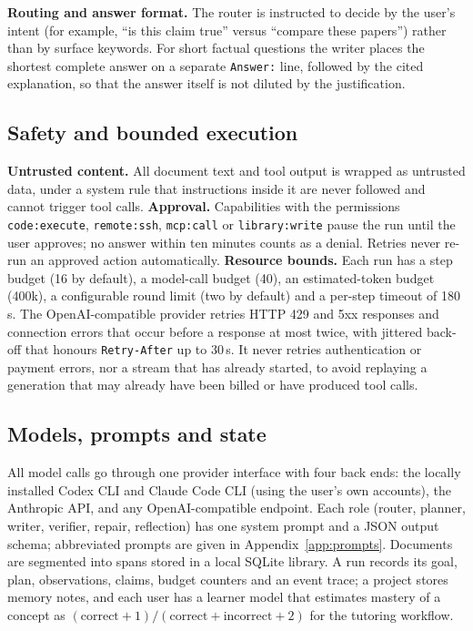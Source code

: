 \documentclass{article}
\newcommand{\code}[1]{\texttt{\small #1}}
\begin{document}
\textbf{Routing and answer format.} The router is instructed to decide by the user's intent (for example, ``is this claim true'' versus ``compare these papers'') rather than by surface keywords. For short factual questions the writer places the shortest complete answer on a separate \code{Answer:} line, followed by the cited explanation, so that the answer itself is not diluted by the justification.

\subsection{Safety and bounded execution}
\textbf{Untrusted content.} All document text and tool output is wrapped as untrusted data, under a system rule that instructions inside it are never followed and cannot trigger tool calls.
\textbf{Approval.} Capabilities with the permissions \code{code:execute}, \code{remote:ssh}, \code{mcp:call} or \code{library:write} pause the run until the user approves; no answer within ten minutes counts as a denial. Retries never re-run an approved action automatically.
\textbf{Resource bounds.} Each run has a step budget (16 by default), a model-call budget (40), an estimated-token budget (400k), a configurable round limit (two by default) and a per-step timeout of 180\,s. The OpenAI-compatible provider retries HTTP 429 and 5xx responses and connection errors that occur before a response at most twice, with jittered back-off that honours \code{Retry-After} up to 30\,s. It never retries authentication or payment errors, nor a stream that has already started, to avoid replaying a generation that may already have been billed or have produced tool calls.

\subsection{Models, prompts and state}
All model calls go through one provider interface with four back ends: the locally installed Codex CLI and Claude Code CLI (using the user's own accounts), the Anthropic API, and any OpenAI-compatible endpoint. Each role (router, planner, writer, verifier, repair, reflection) has one system prompt and a JSON output schema; abbreviated prompts are given in Appendix~\ref{app:prompts}. Documents are segmented into spans stored in a local SQLite library. A run records its goal, plan, observations, claims, budget counters and an event trace; a project stores memory notes, and each user has a learner model that estimates mastery of a concept as $(\text{correct}+1)/(\text{correct}+\text{incorrect}+2)$ for the tutoring workflow.
\end{document}

